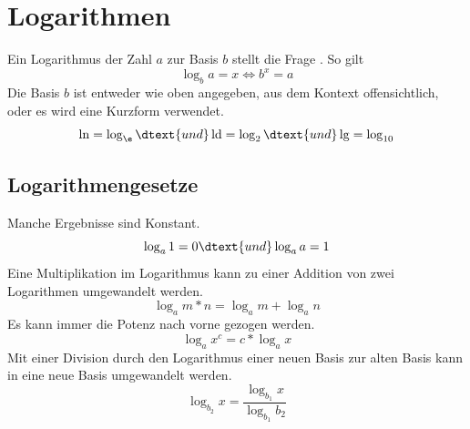 \documentclass{article}
\begin{document}
\section{Logarithmen}
Ein Logarithmus der Zahl $a$ zur Basis $b$ stellt die Frage .
So gilt
\[
 \log_b{a} = x \Leftrightarrow b^x = a
\]
Die Basis $b$ ist entweder wie oben angegeben, aus dem Kontext offensichtlich, oder es wird eine Kurzform verwendet.
\[
 \ln = \log_\e
 \dtext{und}
 \operatorname{ld} = \log_2
 \dtext{und}
 \operatorname{lg} = \log_{10}
\]

\subsection{Logarithmengesetze}
Manche Ergebnisse sind Konstant.
\[
 \log_a{1} = 0 \dtext{und} \log_a{a} = 1
\]
Eine Multiplikation im Logarithmus kann zu einer Addition von zwei Logarithmen umgewandelt werden.
\[
 \log_a{m*n} = \log_a{m} + \log_a{n}
\]
Es kann immer die Potenz nach vorne gezogen werden.
\[
 \log_a{x^c} = c * \log_a{x}
\]
Mit einer Division durch den Logarithmus einer neuen Basis zur alten Basis kann in eine neue Basis umgewandelt werden.
\[
 \log_{b_2}{x} = \frac{\log_{b_1}{x}}{\log_{b_1}{b_2}}
\]
\end{document}
